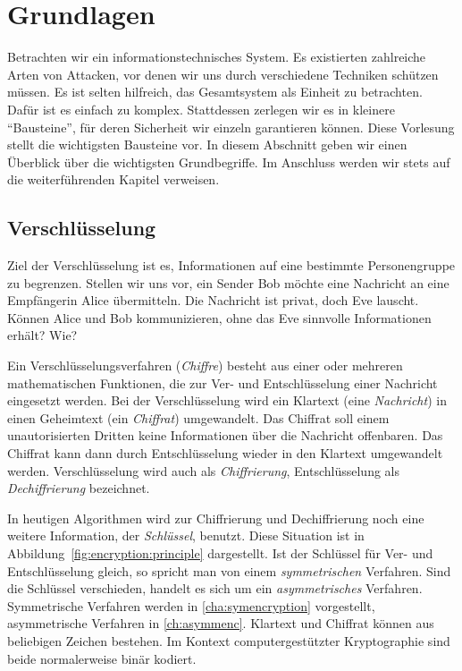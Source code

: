 \section{Grundlagen}
Betrachten wir ein informationstechnisches System. Es existierten
zahlreiche Arten von Attacken, vor denen wir uns durch verschiedene
Techniken schützen müssen. Es ist selten hilfreich, das Gesamtsystem als
Einheit zu betrachten. Dafür ist es einfach zu komplex. Stattdessen
zerlegen wir es in kleinere "`Bausteine"', für deren Sicherheit wir
einzeln garantieren können. Diese Vorlesung stellt die wichtigsten
Bausteine vor. In diesem Abschnitt geben wir einen Überblick über die
wichtigsten Grundbegriffe. Im Anschluss werden wir stets auf die
weiterführenden Kapitel verweisen.

\subsection{Verschlüsselung}

Ziel der Verschlüsselung ist es, Informationen auf eine bestimmte
Personengruppe zu begrenzen. Stellen wir uns vor, ein Sender Bob möchte
eine Nachricht an eine Empfängerin Alice übermitteln. Die Nachricht ist
privat, doch Eve lauscht. Können Alice und Bob kommunizieren, ohne das
Eve sinnvolle Informationen erhält? Wie?

Ein Verschlüsselungsverfahren (\emph{Chiffre}) besteht aus einer oder
mehreren mathematischen Funktionen, die zur Ver- und Entschlüsselung
einer Nachricht eingesetzt werden. Bei der Verschlüsselung wird ein
Klartext (eine \emph{Nachricht}) in einen Geheimtext (ein
\emph{Chiffrat}) umgewandelt. Das Chiffrat soll einem unautorisierten
Dritten keine Informationen über die Nachricht offenbaren. Das Chiffrat
kann dann durch Entschlüsselung wieder in den Klartext umgewandelt
werden. Verschlüsselung wird auch als \emph{Chiffrierung},
Entschlüsselung als \emph{Dechiffrierung} bezeichnet.

In heutigen Algorithmen wird zur Chiffrierung und Dechiffrierung noch
eine weitere Information, der \emph{Schlüssel}, benutzt. Diese Situation
ist in Abbildung~\ref{fig:encryption:principle} dargestellt. Ist der
Schlüssel für Ver- und Entschlüsselung gleich, so spricht man von einem
\emph{symmetrischen} Verfahren\indexEncryptionSymm. Sind die Schlüssel
verschieden, handelt es sich um ein \emph{asymmetrisches}
Verfahren\indexEncryptionAsymm. Symmetrische Verfahren werden in
\autoref{cha:symencryption} vorgestellt, asymmetrische Verfahren in
\autoref{ch:asymmenc}. Klartext und Chiffrat können aus beliebigen
Zeichen bestehen. Im Kontext computergestützter Kryptographie sind beide
normalerweise binär kodiert.

